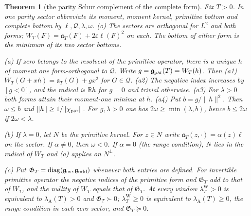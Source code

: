 \documentclass[10pt]{amsart}
\newtheorem{theorem}{Theorem}[section]
\theoremstyle{definition}
\theoremstyle{remark}
\newcommand{\R}{\mathbb R}
\newcommand{\lamW}{\lambda^{\mathrm W}_T}
\newcommand{\lamA}{\lambda_{\mathrm A}(T)}
\begin{document}
\begin{theorem}[the parity Schur complement of the complete form]\label{thm:parityschur}
Fix $T>0$. In one parity sector abbreviate its moment, moment kernel,
primitive bottom and complete bottom by $\ell,\mathcal Q,\lambda,\omega$.
\emph{(o)} The sectors are orthogonal for $L^2$ and both forms;
$W_T(F)=\mathfrak a_T(F)+2\varepsilon\ell(F)^2$ on each. The
bottom of either form is the minimum of its two sector bottoms.

\emph{(a)} If zero belongs to the resolvent of the primitive operator,
there is a unique $h$ of moment one form-orthogonal to $\mathcal Q$.
Write $g=\mathfrak g_{\rm par}(T)=W_T(h)$. Then
\emph{(a1)} $W_T(G+xh)=\mathfrak a_T(G)+gx^2$ for $G\in\mathcal Q$.
\emph{(a2)} The negative index increases by $[g<0]$, and the radical
is $\R h$ for $g=0$ and trivial otherwise.
\emph{(a3)} For $\lambda>0$ both forms attain their moment-one
minima at $h$. \emph{(a4)} Put $b=g/\|h\|^2$. Then $\omega\le b$
and $\|h\|\ge1/\|\chi_{\rm par}\|$. For $g,\lambda>0$ one has
$2\omega\ge\min(\lambda,b)$, hence $b\le2\omega$ if $2\omega<\lambda$.

\emph{(b)} If $\lambda=0$, let $N$ be the primitive kernel. For
$z\in N$ write $\mathfrak a_T(z,\cdot)=\alpha(z)\ell$ on the sector.
If $\alpha\ne0$, then $\omega<0$. If $\alpha=0$ (the range condition),
$N$ lies in the radical of $W_T$ and (a) applies on $N^\perp$.

\emph{(c)} Put $\mathfrak G_T=\operatorname{diag}(\mathfrak g_{\rm ev},
\mathfrak g_{\rm odd})$ whenever both entries are defined.
For invertible primitive operator the negative indices of the primitive
form and $\mathfrak G_T$ add to that of $W_T$, and the nullity of
$W_T$ equals that of $\mathfrak G_T$. At every window $\lamW>0$ is
equivalent to $\lamA>0$ and $\mathfrak G_T\succ0$; $\lamW\ge0$ is
equivalent to $\lamA\ge0$, the range condition in each zero sector,
and $\mathfrak G_T\succeq0$.
\end{theorem}
\end{document}
